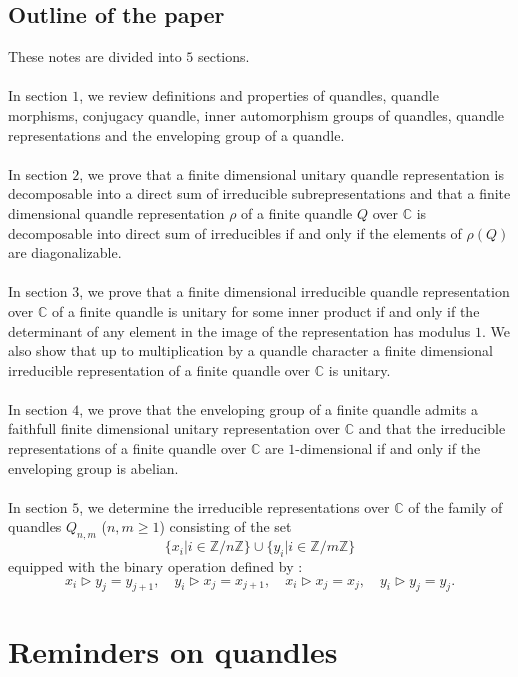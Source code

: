 \documentclass[12pt, reqno]{amsart}
\begin{document}
\subsection*{Outline of the paper}These notes are divided into $5$ sections.\\\\
In section $1$, we review definitions and properties of quandles, quandle morphisms, conjugacy quandle, inner automorphism groups of quandles, quandle representations and the enveloping group of a quandle.\\\\
In section $2$, we prove that a finite dimensional unitary quandle representation is decomposable into a direct sum of irreducible subrepresentations and that a finite dimensional quandle representation $\rho$ of a finite quandle $Q$ over $\mathbb{C}$ is decomposable into direct sum of irreducibles if and only if the elements of $\rho(Q)$ are diagonalizable. \\\\
In section $3$, we prove that a finite dimensional irreducible quandle representation over $\mathbb{C}$ of a finite quandle is unitary for some inner product if and only if the determinant of any element in the image of the representation has modulus $1$. We also show that up to multiplication by a quandle character a finite dimensional irreducible representation of a finite quandle over $\mathbb{C}$ is unitary.\\\\
In section $4$, we prove that the enveloping group of a finite quandle admits a faithfull finite dimensional unitary representation over $\mathbb{C}$ and that the irreducible representations of a finite quandle over $\mathbb{C}$ are $1$-dimensional if and only if the enveloping group is abelian.\\\\
In section $5$, we determine the irreducible representations over $\mathbb{C}$ of the family of quandles $Q_{n,m}$  ($n,m\geq 1$) consisting of the set $$\{x_i \vert i \in \mathbb{Z}/n\mathbb{Z} \} \cup \{y_i \vert i \in \mathbb{Z}/m\mathbb{Z} \}$$ equipped with the binary operation defined by :
$$x_i \triangleright y_j=y_{j+1},\quad y_i\triangleright x_j=x_{j+1} ,\quad x_{i}\triangleright x_j=x_j,\quad y_i\triangleright y_j=y_j.$$

 
\section{Reminders on quandles}
\end{document}
